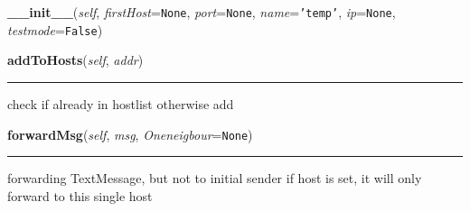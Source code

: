 \hspace{.8\funcindent}\begin{boxedminipage}{\funcwidth}

    \raggedright \textbf{\_\_init\_\_}(\textit{self}, \textit{firstHost}={\tt None}, \textit{port}={\tt None}, \textit{name}={\tt \texttt{'}\texttt{temp}\texttt{'}}, \textit{ip}={\tt None}, \textit{testmode}={\tt False})

\setlength{\parskip}{2ex}
\setlength{\parskip}{1ex}
    \end{boxedminipage}

    \label{peer:Peer:addToHosts}

    \vspace{0.5ex}

\hspace{.8\funcindent}\begin{boxedminipage}{\funcwidth}

    \raggedright \textbf{addToHosts}(\textit{self}, \textit{addr})

    \vspace{-1.5ex}

    \rule{\textwidth}{0.5\fboxrule}
\setlength{\parskip}{2ex}
    check if already in hostlist otherwise add

\setlength{\parskip}{1ex}
    \end{boxedminipage}

    \label{peer:Peer:forwardMsg}

    \vspace{0.5ex}

\hspace{.8\funcindent}\begin{boxedminipage}{\funcwidth}

    \raggedright \textbf{forwardMsg}(\textit{self}, \textit{msg}, \textit{Oneneigbour}={\tt None})

    \vspace{-1.5ex}

    \rule{\textwidth}{0.5\fboxrule}
\setlength{\parskip}{2ex}
    forwarding TextMessage, but not to initial sender if host is set, it 
    will only forward to this single host

\setlength{\parskip}{1ex}
    \end{boxedminipage}

    \label{peer:Peer:generateMsgParts}

